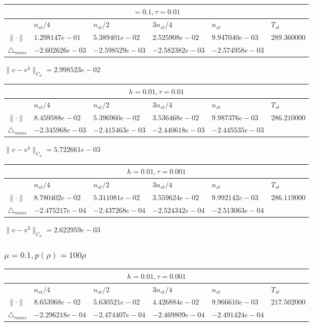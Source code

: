 \begin{tabular}{*{6}{|l}|}
    \hline
     \\
    \hline
    &$n_{st}/4 $&$ n_{st}/2$&$3n_{st}/4$&$n_{st}$&$T_{st}$ \\
    \hline
$\|\cdot \|$& $1.298147e-01$ & $5.389401e-02$ & $2.525908e-02$ & $9.947040e-03$ &$289.360000$\\
\hline
$\triangle_{mass}$& $-2.602626e-03$ & $-2.598529e-03$ & $-2.582382e-03$ & $-2.574958e-03$ &\\
\hline
\end{tabular}

$\|v-v^{4}\|_{C_h} = 2.998523e-02$

\begin{tabular}{*{6}{|l}|}
    \hline
     \\
    \hline
    &$n_{st}/4 $&$ n_{st}/2$&$3n_{st}/4$&$n_{st}$&$T_{st}$ \\
    \hline
    $\|\cdot \|$& $8.459588e-02$ & $5.396960e-02$ & $3.536468e-02$ & $9.987376e-03$ &$286.210000$\\
\hline
$\triangle_{mass}$& $-2.345968e-03$ & $-2.415463e-03$ & $-2.440618e-03$ & $-2.445535e-03$ &\\
\hline
\end{tabular}

$\|v-v^{4}\|_{C_h} = 5.722661e-03$

\begin{tabular}{*{6}{|l}|}
    \hline
     \\
    \hline
    &$n_{st}/4 $&$ n_{st}/2$&$3n_{st}/4$&$n_{st}$&$T_{st}$ \\
    \hline
    $\|\cdot \|$& $8.780402e-02$ & $5.311081e-02$ & $3.559624e-02$ & $9.992142e-03$ &$286.119000$\\
\hline
$\triangle_{mass}$& $-2.475217e-04$ & $-2.437268e-04$ & $-2.524342e-04$ & $-2.513063e-04$ &\\
\hline
\end{tabular}
$\|v-v^{3}\|_{C_h} = 2.622959e-03$

\subsubsection{$\mu = 0.1, p(\rho) = 100\rho $}

\begin{tabular}{*{6}{|l}|}
    \hline
     \\
    \hline
    &$n_{st}/4 $&$ n_{st}/2$&$3n_{st}/4$&$n_{st}$&$T_{st}$ \\
    \hline
    $\|\cdot \|$& $8.653968e-02$ & $5.630521e-02$ & $4.426884e-02$ & $9.966610e-03$ &$217.502000$\\
\hline
$\triangle_{mass}$& $-2.296218e-04$ & $-2.474407e-04$ & $-2.469809e-04$ & $-2.491424e-04$ &\\
\hline
\end{tabular}

